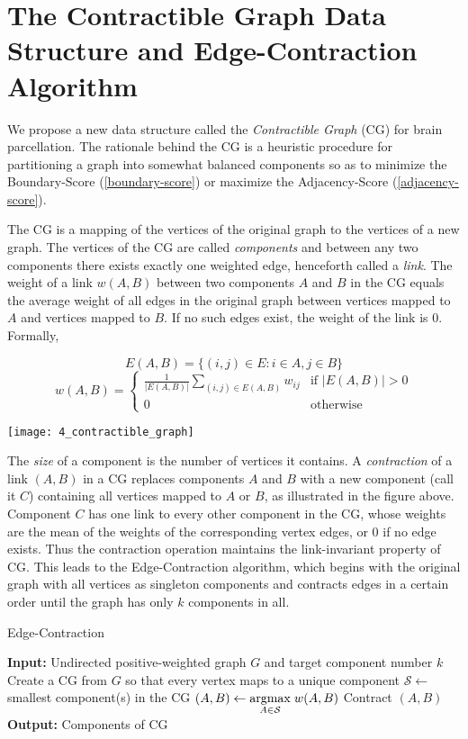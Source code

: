 \section{The Contractible Graph Data Structure and
Edge-Contraction Algorithm}

We propose a new data structure called the \textit{Contractible Graph}
(CG) for brain parcellation. The rationale behind the CG is a heuristic
procedure for partitioning a graph into somewhat balanced components
so as to minimize the Boundary-Score (\ref{boundary-score}) or maximize
the Adjacency-Score (\ref{adjacency-score}).

The CG is a mapping of the vertices of the original graph to the
vertices of a new graph. The vertices of the CG are called
\textit{components} and between any two components there exists exactly
one weighted edge, henceforth called a \textit{link}. The weight
of a link $w(A,B)$ between two components $A$ and $B$ in the CG equals
the average weight of all edges in the original graph between vertices
mapped to $A$ and vertices mapped to $B$. If no such edges exist,
the weight of the link is $0$. Formally,

\[ E(A,B) = \{(i, j) \in E : i \in A, j \in B\} \]
\[ w(A,B) = \begin{cases}
    \frac{1}{|E(A,B)|} \sum_{(i,j) \in E(A,B)} w_{ij} &
        \text{if } |E(A,B)| > 0 \\
    0 & \text{otherwise}
\end{cases} \]

\texttt{[image: 4\_contractible\_graph]}

The \textit{size} of a component is the number of vertices it contains.
A \textit{contraction} of a link $(A,B)$ in a CG replaces components
$A$ and $B$ with a new component (call it $C$) containing all vertices
mapped to $A$ or $B$, as illustrated in the figure above.
Component $C$ has one link to every other component in the CG, whose
weights are the mean of the weights of the corresponding vertex edges,
or $0$ if no edge exists. Thus the contraction operation maintains the
link-invariant property of CG. This leads to the Edge-Contraction
algorithm, which begins with the original graph with all vertices as
singleton components and contracts edges in a certain order until the
graph has only $k$ components in all.

\begin{algorithm}
\caption{Edge-Contraction}
\begin{algorithmic}
\State \textbf{Input:} Undirected positive-weighted graph $G$ and
       target component number $k$
\State Create a CG from $G$ so that every vertex maps to
       a unique component
\Repeat
\State $\mathcal{S} \gets$ smallest component(s) in the CG
\State $(A,B) \gets \underset{A \in \mathcal{S}}{\mathrm{arg max}}\; w(A,B)$
\State Contract $(A,B)$
\State \textbf{Output:} Components of CG
\end{algorithmic}
\end{algorithm}

